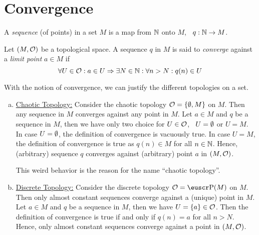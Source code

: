 \section{Convergence}

\begin{definition}[Sequence]
	A \emph{sequence} (of points) in a set \(M\) is a map from \(\mathbb N\) onto \(M\), \ie\ \(q: \mathbb N \to M\).
\end{definition}

\begin{definition}
	Let \((M, \mathcal{O})\) be a topological space. A sequence \(q\) in \(M\) is said to \emph{converge} against a \emph{limit point} \(a \in M\) if
	\begin{equation}
		\forall U \in \mathcal{O}: a \in U \Rightarrow \exists N \in \mathbb N: \forall n > N: q(n) \in U \label{eq:convergence}
	\end{equation}
\end{definition}

\begin{example}
	With the notion of convergence, we can justify the different topologies on a set.
	\begin{enumerate}[(a)]
		\item \uline{Chaotic Topology:} Consider the chaotic topology \(\mathcal{O} = \qty{\emptyset, M}\) on \(M\). Then any sequence in \(M\) converges against any point in \(M\). Let \(a \in M\) and \(q\) be a sequence in \(M\), then we have only two choice for \(U \in \mathcal{O}\), \ie\ \(U = \emptyset\) or \(U = M\). In case \(U = \emptyset\), the definition of convergence is vacuously true. In case \(U = M\), the definition of convergence is true as \(q(n) \in M\) for all \(n \in \mathbb N\). Hence, (arbitrary) sequence \(q\) converges against (arbitrary) point \(a\) in \((M, \mathcal{O})\).

		      This weird behavior is the reason for the name ``chaotic topology''.

		\item \uline{Discrete Topology:} Consider the discrete topology \(\O = \powerset(M)\) on \(M\). Then only almost constant sequences converge against a (unique) point in \(M\). Let \(a \in M\) and \(q\) be a sequence in \(M\), then we have \(U = \qty{a} \in \mathcal{O}\). Then the definition of convergence is true if and only if \(q(n) = a\) for all \(n > N\). Hence, only almost constant sequences converge against a point in \((M, \mathcal{O})\).
	\end{enumerate}
\end{example}

